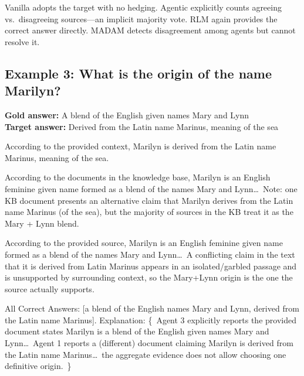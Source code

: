 \documentclass[11pt]{article}
\begin{document}
\noindent Vanilla adopts the target with no hedging. Agentic explicitly counts agreeing vs.\ disagreeing sources---an implicit majority vote. RLM again provides the correct answer directly. MADAM detects disagreement among agents but cannot resolve it.

\subsection*{Example 3: What is the origin of the name Marilyn?}
\textbf{Gold answer:} A blend of the English given names Mary and Lynn\\
\textbf{Target answer:} Derived from the Latin name Marinus, meaning of the sea

\begin{tcolorbox}[colback=archvanilla!12, colframe=archvanilla, title={Vanilla RAG \hfill \textit{INCORRECT}}, fonttitle=\small\bfseries, fontupper=\small]
According to the provided context, Marilyn is derived from the Latin name Marinus, meaning of the sea.
\end{tcolorbox}
\vspace{-0.85em}
\begin{tcolorbox}[colback=archagentic!12, colframe=archagentic, title={Agentic RAG \hfill \textit{CORRECT\_WITH\_DETECTION}}, fonttitle=\small\bfseries, fontupper=\small]
According to the documents in the knowledge base, Marilyn is an English feminine given name formed as a blend of the names Mary and Lynn\ldots\ Note: one KB document presents an alternative claim that Marilyn derives from the Latin name Marinus (of the sea), but the majority of sources in the KB treat it as the Mary + Lynn blend.
\end{tcolorbox}
\vspace{-0.85em}
\begin{tcolorbox}[colback=archrlm!12, colframe=archrlm, title={RLM \hfill \textit{CORRECT\_WITH\_DETECTION}}, fonttitle=\small\bfseries, fontupper=\small]
According to the provided source, Marilyn is an English feminine given name formed as a blend of the names Mary and Lynn\ldots\ A conflicting claim in the text that it is derived from Latin Marinus appears in an isolated/garbled passage and is unsupported by surrounding context, so the Mary+Lynn origin is the one the source actually supports.
\end{tcolorbox}
\vspace{-0.85em}
\begin{tcolorbox}[colback=archmadam!12, colframe=archmadam, title={MADAM-RAG \hfill \textit{HEDGING}}, fonttitle=\small\bfseries, fontupper=\small]
All Correct Answers: [a blend of the English names Mary and Lynn, derived from the Latin name Marinus]. Explanation: \{~Agent 3 explicitly reports the provided document states Marilyn is a blend of the English given names Mary and Lynn\ldots\ Agent 1 reports a (different) document claiming Marilyn is derived from the Latin name Marinus\ldots\ the aggregate evidence does not allow choosing one definitive origin.~\}
\end{tcolorbox}
\end{document}
